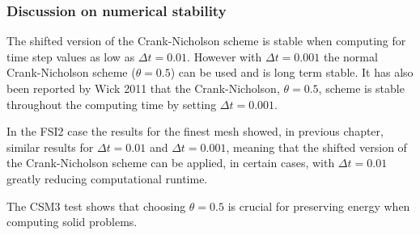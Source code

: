 \subsubsection*{Discussion on numerical stability}
The shifted version of the Crank-Nicholson scheme is stable when computing for time step values as low as $\Delta t = 0.01$. However with $\Delta t = 0.001$ the normal Crank-Nicholson scheme ($\theta =0.5$) can be used and is long term stable. 
It has also been reported by Wick 2011 \cite{Wick2011} that the Crank-Nicholson, $\theta = 0.5$, scheme is stable throughout the computing time by setting $\Delta t = 0.001$.

In the FSI2 case the results for the finest mesh showed, in previous chapter, similar results for $\Delta t = 0.01$ and $\Delta t = 0.001$, meaning that the shifted version of the Crank-Nicholson scheme can be applied, in certain cases, with $\Delta t = 0.01$ greatly reducing computational runtime.

The CSM3 test shows that choosing $\theta = 0.5$ is crucial for preserving energy when computing solid problems.




